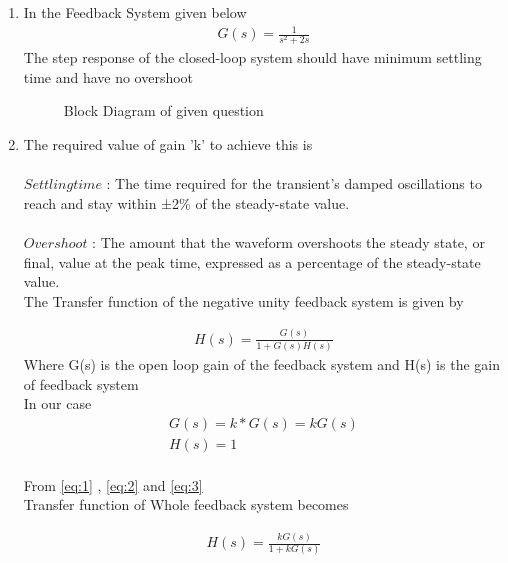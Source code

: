 \begin{enumerate}[label=\thesection.\arabic*.,ref=\thesection.\theenumi]

\item
In the Feedback System given below 
\begin{align}
\label{eq:ee18btech11035_G(s)}
 G(s)=\frac{1}{s^2+2s}
\end{align}
The step response of the closed-loop system should have minimum settling time and have no overshoot\\

\begin{figure}[!ht]
    \begin{center}
		
		\resizebox{\columnwidth}{!}{}
	\end{center}
\caption{Block Diagram of given question}
\label{fig:block2}
\end{figure}

\item The required value of gain 'k' to achieve this is\\
\solution \\$Settling time$ : The time required for the transient's damped oscillations to
reach and stay within ±2\% of the steady-state value.\\
\\$Overshoot$ : The amount that the waveform overshoots the steady state, or final, value at the peak time, expressed as a percentage of the steady-state
value.\\

The Transfer function of the negative unity feedback system is given by 

\begin{align}
H(s)=\frac{G(s)}{1+G(s)H(s)}
\label{eq:1}
\end{align}
Where G(s) is the open loop gain of the feedback system and H(s) is the gain of feedback system \\
In our case
 \begin{align}
G(s) = k*G(s) = kG(s)
\label{eq:2}\\
H(s) = 1
\label{eq:3}
\end{align}
\\
From \eqref{eq:1} , \eqref{eq:2} and \eqref{eq:3}\\
Transfer function of Whole feedback system becomes

 \begin{align}
H(s) = \frac{kG(s)}{1+kG(s)}
\label{eq:4}
\end{align}


\end{enumerate}
